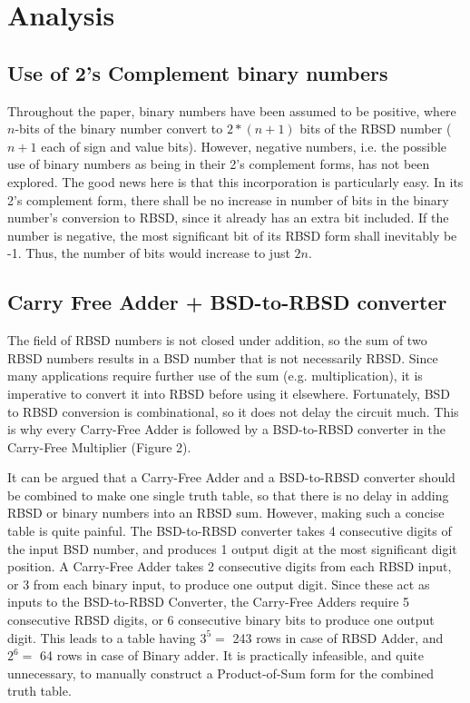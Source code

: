 \documentclass[conference]{IEEEtran}
\begin{document}
\section{Analysis}

\subsection{Use of 2's Complement binary numbers}

Throughout the paper, binary numbers have been assumed to be positive, where $n$-bits of the binary number convert to $2*(n+1)$ bits of the RBSD number ($n+1$ each of sign and value bits). However, negative numbers, i.e. the possible use of binary numbers as being in their 2's complement forms, has not been explored. The good news here is that this incorporation is particularly easy. In its 2's complement form, there shall be no increase in number of bits in the binary number's conversion to RBSD, since it already has an extra bit included. If the number is negative, the most significant bit of its RBSD form shall inevitably be -1. Thus, the number of bits would increase to just $2n$.

\subsection{Carry Free Adder + BSD-to-RBSD converter}

The field of RBSD numbers is not closed under addition, so the sum of two RBSD numbers results in a BSD number that is not necessarily RBSD. Since many applications require further use of the sum (e.g. multiplication), it is imperative to convert it into RBSD before using it elsewhere. Fortunately, BSD to RBSD conversion is combinational, so it does not delay the circuit much. This is why every Carry-Free Adder is followed by a BSD-to-RBSD converter in the Carry-Free Multiplier (Figure 2).

It can be argued that a Carry-Free Adder and a BSD-to-RBSD converter should be combined to make one single truth table, so that there is no delay in adding RBSD or binary numbers into an RBSD sum. However, making such a concise table is quite painful. The BSD-to-RBSD converter takes 4 consecutive digits of the input BSD number, and produces 1 output digit at the most significant digit position. A Carry-Free Adder takes 2 consecutive digits from each RBSD input, or 3 from each binary input, to produce one output digit. Since these act as inputs to the BSD-to-RBSD Converter, the Carry-Free Adders require 5 consecutive RBSD digits, or 6 consecutive binary bits to produce one output digit. This leads to a table having $3^5 =$ 243 rows in case of RBSD Adder, and $2^6 =$ 64 rows in case of Binary adder. It is practically infeasible, and quite unnecessary, to manually construct a Product-of-Sum form for the combined truth table.
\end{document}
